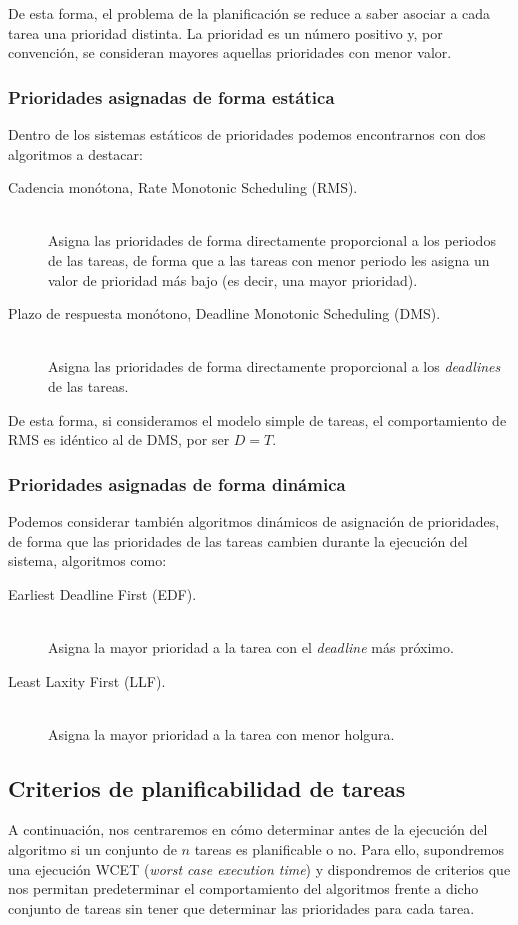 De esta forma, el problema de la planificación se reduce a saber asociar a cada tarea una prioridad distinta. La prioridad es un número positivo y, por convención, se consideran mayores aquellas prioridades con menor valor.

\subsubsection{Prioridades asignadas de forma estática}
Dentro de los sistemas estáticos de prioridades podemos encontrarnos con dos algoritmos a destacar:
\begin{description}
    \item [Cadencia monótona, Rate Monotonic Scheduling (RMS).]~\\ Asigna las prioridades de forma directamente proporcional a los periodos de las tareas, de forma que a las tareas con menor periodo les asigna un valor de prioridad más bajo (es decir, una mayor prioridad).
    \item [Plazo de respuesta monótono, Deadline Monotonic Scheduling (DMS).]~\\ Asigna las prioridades de forma directamente proporcional a los \textit{deadlines} de las tareas.
\end{description}
De esta forma, si consideramos el modelo simple de tareas, el comportamiento de RMS es idéntico al de DMS, por ser $D = T$.

\subsubsection{Prioridades asignadas de forma dinámica}
Podemos considerar también algoritmos dinámicos de asignación de prioridades, de forma que las prioridades de las tareas cambien durante la ejecución del sistema, algoritmos como:
\begin{description}
    \item [Earliest Deadline First (EDF).]~\\ Asigna la mayor prioridad a la tarea con el \textit{deadline} más próximo.
    \item [Least Laxity First (LLF).]~\\ Asigna la mayor prioridad a la tarea con menor holgura.
\end{description}

\subsection{Criterios de planificabilidad de tareas}
A continuación, nos centraremos en cómo determinar antes de la ejecución del algoritmo si un conjunto de $n$ tareas es planificable o no. Para ello, supondremos una ejecución WCET (\textit{worst case execution time}) y dispondremos de criterios que nos permitan predeterminar el comportamiento del algoritmos frente a dicho conjunto de tareas sin tener que determinar las prioridades para cada tarea.

